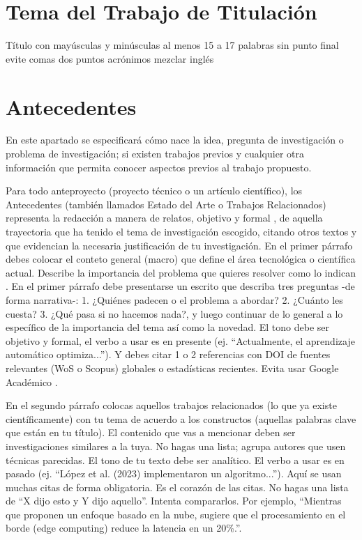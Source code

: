 \documentclass[12pt]{article}
\begin{document}

\section{Tema del Trabajo de Titulación  }
\noindent Título con mayúsculas y minúsculas al menos 15 a 17 palabras sin punto final evite comas dos puntos acrónimos mezclar inglés 

\section{Antecedentes}
{\color{magenta}En este apartado se especificará cómo nace la idea, pregunta de investigación o problema de investigación; si existen trabajos previos y cualquier otra información que permita conocer aspectos previos al trabajo propuesto.}

Para todo anteproyecto (proyecto técnico o un artículo científico), los Antecedentes (también llamados Estado del Arte o Trabajos Relacionados) representa la redacción a manera de relatos, objetivo y formal \parencite{puga2023mapeo,Melendrez-Caicedo2022}, de aquella trayectoria que ha tenido el tema de investigación escogido, citando otros textos y que evidencian la necesaria justificación de tu investigación. En el primer párrafo debes colocar el conteto general (macro) que define el área tecnológica o científica actual. Describe la importancia del problema que quieres resolver como lo indican \textcite{Llerena-Izquierdo_Ayala-Carabajo_2022,10389227}. En el primer párrafo debe presentarse un escrito que describa tres preguntas -de forma narrativa-: 1. ¿Quiénes padecen o el problema a abordar? 2. ¿Cuánto les cuesta? 3. ¿Qué pasa si no hacemos nada?, y luego continuar de lo general a lo específico de la importancia del tema así como la novedad. El tono debe ser objetivo y formal, el verbo a usar es en presente (ej. ``Actualmente, el aprendizaje automático optimiza...''). Y debes citar 1 o 2 referencias con DOI de fuentes relevantes (WoS o Scopus) globales o estadísticas recientes. Evita usar Google Académico \parencite{llerena2025guia}. 

En el segundo párrafo colocas aquellos trabajos relacionados (lo que ya existe científicamente) con tu tema de acuerdo a los constructos (aquellas palabras clave que están en tu título). El contenido que vas a mencionar deben ser investigaciones similares a la tuya. No hagas una lista; agrupa autores que usen técnicas parecidas. El tono de tu texto debe ser analítico. El verbo a usar es en pasado (ej. ``López et al. (2023) implementaron un algoritmo...''). Aquí se usan muchas citas de forma obligatoria. Es el corazón de las citas. No hagas una lista de ``X dijo esto y Y dijo aquello''. Intenta compararlos. Por ejemplo,  ``Mientras que \textcite{Sanchez-Romero_Llerena-Izquierdo_2023} proponen un enfoque basado en la nube, \textcite{zambrano2024revision} sugiere que el procesamiento en el borde (edge computing) reduce la latencia en un 20\%.''.
\end{document}
